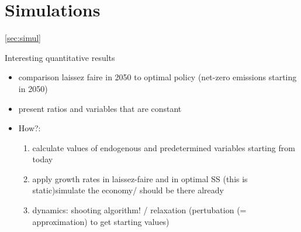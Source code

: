 \section{Simulations}\ref{sec:simul}

Interesting quantitative results

\begin{itemize}
	\item comparison laissez faire in 2050 to optimal policy (net-zero emissions starting in 2050)
	\item present ratios and variables that are constant 
	\item How?: 
	\begin{enumerate}
	\item calculate values of endogenous and predetermined variables starting from today
	\item apply growth rates in laissez-faire and in optimal SS (this is static)\ar simulate the economy/ should be there already
	\item dynamics: shooting algorithm! / relaxation (pertubation (= approximation) to get starting values)
	\end{enumerate}
\end{itemize}